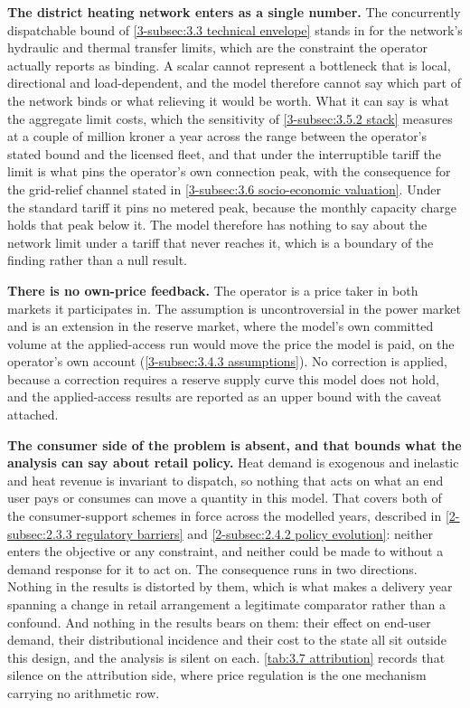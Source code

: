 \textbf{The district heating network enters as a single number.} The concurrently dispatchable bound of \autoref{3-subsec:3.3 technical envelope} stands in for the network's hydraulic and thermal transfer limits, which are the constraint the operator actually reports as binding. A scalar cannot represent a bottleneck that is local, directional and load-dependent, and the model therefore cannot say which part of the network binds or what relieving it would be worth. What it can say is what the aggregate limit costs, which the sensitivity of \autoref{3-subsec:3.5.2 stack} measures at a couple of million kroner a year across the range between the operator's stated bound and the licensed fleet, and that under the interruptible tariff the limit is what pins the operator's own connection peak, with the consequence for the grid-relief channel stated in \autoref{3-subsec:3.6 socio-economic valuation}. Under the standard tariff it pins no metered peak, because the monthly capacity charge holds that peak below it. The model therefore has nothing to say about the network limit under a tariff that never reaches it, which is a boundary of the finding rather than a null result.

\textbf{There is no own-price feedback.} The operator is a price taker in both markets it participates in. The assumption is uncontroversial in the power market and is an extension in the reserve market, where the model's own committed volume at the applied-access run would move the price the model is paid, on the operator's own account (\autoref{3-subsec:3.4.3 assumptions}). No correction is applied, because a correction requires a reserve supply curve this model does not hold, and the applied-access results are reported as an upper bound with the caveat attached.

\textbf{The consumer side of the problem is absent, and that bounds what the analysis can say about retail policy.} Heat demand is exogenous and inelastic and heat revenue is invariant to dispatch, so nothing that acts on what an end user pays or consumes can move a quantity in this model. That covers both of the consumer-support schemes in force across the modelled years, described in \autoref{2-subsec:2.3.3 regulatory barriers} and \autoref{2-subsec:2.4.2 policy evolution}: neither enters the objective or any constraint, and neither could be made to without a demand response for it to act on. The consequence runs in two directions. Nothing in the results is distorted by them, which is what makes a delivery year spanning a change in retail arrangement a legitimate comparator rather than a confound. And nothing in the results bears on them: their effect on end-user demand, their distributional incidence and their cost to the state all sit outside this design, and the analysis is silent on each. \autoref{tab:3.7 attribution} records that silence on the attribution side, where price regulation is the one mechanism carrying no arithmetic row.

